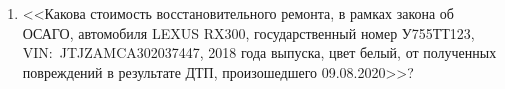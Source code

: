 \begin{enumerate}
	\item <<Какова стоимость восстановительного ремонта, в рамках закона об ОСАГО,  автомобиля LEXUS RX300, государственный номер У755ТТ123, VIN:~JTJZAMCA302037447, 2018 года выпуска, цвет белый, от полученных повреждений в результате ДТП, произошедшего 09.08.2020>>?
%	
%	
%	
%	

\end{enumerate}
